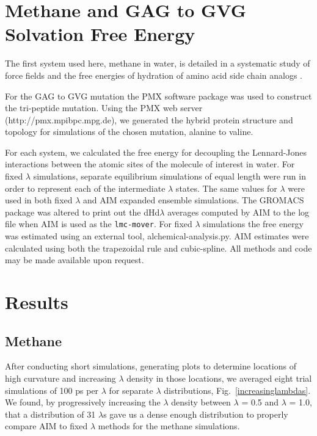 \section{Methane and GAG to GVG Solvation Free Energy}

The first system used here, methane in water, is detailed in a systematic study of force fields and the free energies of hydration of amino acid side chain analogs \cite{Sun1992,Lyubartsev1996,Chodera2011,Paliwal2011}.

For the GAG to GVG mutation the PMX \cite{Gapsys2015} software package was used to construct the tri-peptide mutation. Using the PMX web server (http://pmx.mpibpc.mpg.de), we generated the hybrid protein structure and topology for simulations of the chosen mutation, alanine to valine.

For each system, we calculated the free energy for decoupling the Lennard-Jones interactions between the atomic sites of the molecule of interest in water. For fixed $\lambda$ simulations, separate equilibrium simulations of equal length were run in order to represent each of the intermediate $\lambda$ states. The same values for $\lambda$ were used in both fixed $\lambda$ and AIM expanded ensemble simulations. The GROMACS package was altered to print out the dHd$\lambda$ averages computed by AIM to the log file when AIM is used as the \texttt{lmc-mover}. For fixed $\lambda$ simulations the free energy was estimated using an external tool, alchemical-analysis.py. AIM estimates were calculated using both the trapezoidal rule and cubic-spline. All methods and code may be made available upon request.

\section{Results}

\subsection{Methane}

After conducting short simulations, generating plots to determine locations of high curvature and increasing $\lambda$ density in those locations, we averaged eight trial simulations of 100 ps per $\lambda$ for separate $\lambda$ distributions, Fig.\ \ref{increasinglambdas}. We found, by progressively increasing the $\lambda$ density between $\lambda$ = 0.5 and $\lambda$ = 1.0, that a distribution of 31 $\lambda$s gave us a dense enough distribution to properly compare AIM to fixed $\lambda$ methods for the methane simulations.

